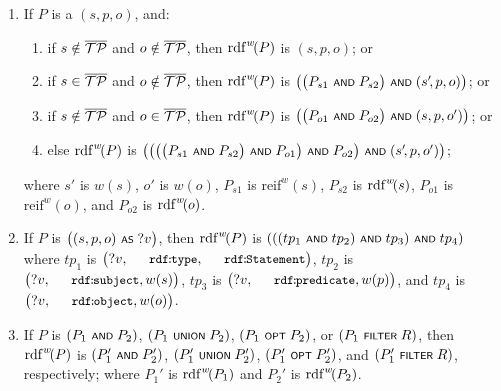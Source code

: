 \begin{enumerate}
	\item If $P$ is a {\TPplus} $(s,p,o)$, and:
		\begin{enumerate}
			\item if $s \notin \overline{\mathcal{TP}}$ and $o \notin \overline{\mathcal{TP}}$, then $\mathrm{rdf}^{w}\!(P)$ is $(s,p,o)$; or
			\item if $s \in \overline{\mathcal{TP}}$ and $o \notin \overline{\mathcal{TP}}$, then $\mathrm{rdf}^{w}\!(P)$ is $\bigl( \bigl( P_{s1} \text{ \normalfont\scriptsize\textsf{AND} } P_{s2} \bigr) \text{ \normalfont\scriptsize\textsf{AND} } (s'\!,p,o) \bigr)$; or
			\item if $s \notin \overline{\mathcal{TP}}$ and $o \in \overline{\mathcal{TP}}$, then $\mathrm{rdf}^{w}\!(P)$ is $\bigl( \bigl( P_{o1} \text{ \normalfont\scriptsize\textsf{AND} } P_{o2} \bigr) \text{ \normalfont\scriptsize\textsf{AND} } (s,p,o') \bigr)$; or
			\item else $\mathrm{rdf}^{w}\!(P)$ is $\bigl( \bigl( \bigl( \bigl( P_{s1} \text{ \normalfont\scriptsize\textsf{AND} } P_{s2} \bigr) \text{ \normalfont\scriptsize\textsf{AND} } P_{o1} \bigr) \text{ \normalfont\scriptsize\textsf{AND} } P_{o2} \bigr) \text{ \normalfont\scriptsize\textsf{AND} } (s'\!,p,o') \bigr)$;
		\end{enumerate}
		where $s'$ is $w(s)$, $o'$ is $w(o)$, $P_{s1}$ is $\mathrm{reif}^w\!(s)$, $P_{s2}$ is $\mathrm{rdf}^{w}\!(s)$, $P_{o1}$ is $\mathrm{reif}^w\!(o)$, and $P_{o2}$ is $\mathrm{rdf}^{w}\!(o)$.
		\vspace{1ex}

	\item If $P$ is
			$\bigl( (s,p,o) \text{ \normalfont\scriptsize\textsf{AS} } ?v \bigr)$,
		then $\mathrm{rdf}^{w}\!(P)$ is $( ( ( tp_1 \text{ \normalfont\scriptsize\textsf{AND} } tp_2 ) \text{ \normalfont\scriptsize\textsf{AND} } tp_3 ) \text{ \normalfont\scriptsize\textsf{AND} } tp_4 )$ where $tp_1$ is $\bigl(?v,\mathTinyRDF{rdf\!:\!type},\mathTinyRDF{rdf\!:\!Statement}\bigr)$, $tp_2$ is $\bigl(?v,\mathTinyRDF{rdf\!:\!subject},w(s)\bigr)$, $tp_3$ is $\bigl(?v,\mathTinyRDF{rdf\!:\!predicate},w(p)\bigr)$, and $tp_4$ is $\bigl(?v,\mathTinyRDF{rdf\!:\!object},w(o)\bigr)$.


		\vspace{1ex}
	\item If $P$ is $(P_1 \text{ \normalfont\scriptsize\textsf{AND} } P_2)$, $(P_1 \text{ \normalfont\scriptsize\textsf{UNION} } P_2)$, $(P_1 \text{ \normalfont\scriptsize\textsf{OPT} } P_2)$, or $(P_1 \text{ \normalfont\scriptsize\textsf{FILTER} } R)$, then $\mathrm{rdf}^{w}\!(P)$ is $(P_1' \text{ \normalfont\scriptsize\textsf{AND} } P_2')$, $(P_1' \text{ \normalfont\scriptsize\textsf{UNION} } P_2')$, $(P_1' \text{ \normalfont\scriptsize\textsf{OPT} } P_2')$, and $(P_1' \text{ \normalfont\scriptsize\textsf{FILTER} } R)$, respectively; where $P_1'$ is $\mathrm{rdf}^{w}\!(P_1)$ and $P_2'$ is $\mathrm{rdf}^{w}\!(P_2)$.


\end{enumerate}
